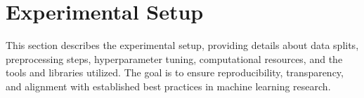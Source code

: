 \section{Experimental Setup}

This section describes the experimental setup, providing details about data splits, preprocessing steps, hyperparameter tuning, computational resources, and the tools and libraries utilized. The goal is to ensure reproducibility, transparency, and alignment with established best practices in machine learning research.
% 
\begin{table*}[h]
    \centering
    \caption{Results across Track A, B, and C showing macro-average F1 scores of Our Model , Paraticipants Best Model scores, Task Dataset Model(Baseline)\citep{muhammad2025brighterbridginggaphumanannotated} and rankings.}
    \label{tab:results}
\end{table*}
